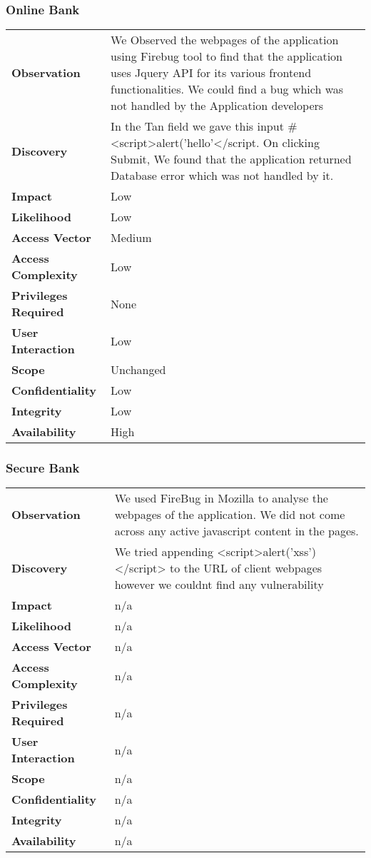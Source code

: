 \subsubsection*{Online Bank}
\begin{tabular}{l|p{10cm}}

\textbf{Observation} & We Observed the webpages of the application using Firebug tool to find that the application uses Jquery API for its various frontend functionalities. We could find a bug which was not handled by the Application developers \\
\textbf{Discovery} & In the Tan field we gave this input #<script>alert('hello'</script. On clicking Submit, We found that the application returned Database error which was not handled by it.\\
\textbf{Impact} & Low \\
\textbf{Likelihood} & Low \\
\textbf{Access Vector} & Medium \\
\textbf{Access Complexity} & Low \\
\textbf{Privileges Required} & None \\
\textbf{User Interaction} & Low \\
\textbf{Scope} & Unchanged \\
\textbf{Confidentiality} & Low \\
\textbf{Integrity} & Low \\
\textbf{Availability} & High \\
\end{tabular}
\subsubsection{Secure Bank}
\begin{tabular}{l|p{10cm}}

\textbf{Observation} & We used FireBug in Mozilla to analyse the webpages of the application. We did not come across any active javascript content in the pages.  \\
\textbf{Discovery} & We tried appending <script>alert('xss')</script> to the URL of client webpages however we couldnt find any vulnerability \\
\textbf{Impact} &  n/a\\
\textbf{Likelihood} & n/a \\
\textbf{Access Vector} & n/a \\
\textbf{Access Complexity} & n/a \\
\textbf{Privileges Required} & n/a \\
\textbf{User Interaction} & n/a \\
\textbf{Scope} & n/a \\
\textbf{Confidentiality} & n/a \\
\textbf{Integrity} & n/a \\
\textbf{Availability} & n/a \\
\end{tabular}


